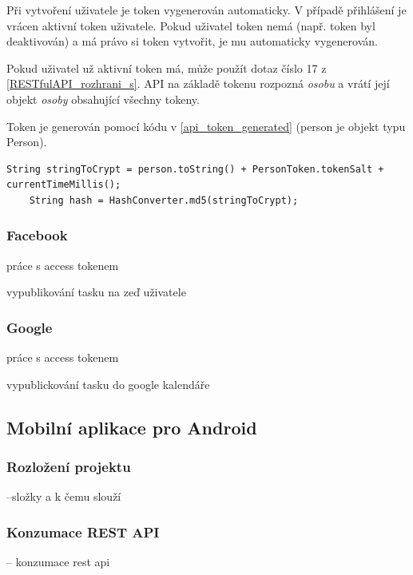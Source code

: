 \documentclass[thesis=B,czech]{FITthesis}[2012/06/26]
\begin{document}
Při vytvoření uživatele je token vygenerován automaticky. V případě přihlášení je vrácen aktivní token uživatele. Pokud uživatel token nemá (např. token byl deaktivován) a má právo si token vytvořit, je mu automaticky vygenerován.

Pokud uživatel už aktivní token má, může použít dotaz číslo 17 z \ref{RESTfulAPI_rozhrani_s}. API na základě tokenu rozpozná \textit{osobu} a vrátí její objekt \textit{osoby} obsahující všechny tokeny. 

Token je generován pomocí kódu v \ref{api_token_generated} (person je objekt typu Person).

\begin{lstlisting}[label=api_token_generated,caption=Generování uživatelského tokenu]
	String stringToCrypt = person.toString() + PersonToken.tokenSalt + currentTimeMillis();
	String hash = HashConverter.md5(stringToCrypt);
\end{lstlisting}



\subsubsection{Facebook}

práce s access tokenem

vypublikování tasku na zeď uživatele

\subsubsection{Google}

práce s access tokenem

vypublickování tasku do google kalendáře


\subsection{Mobilní aplikace pro Android}

\subsubsection{Rozložení projektu}

--složky a k čemu slouží

\subsubsection{Konzumace REST API}

-- konzumace rest api
\end{document}
